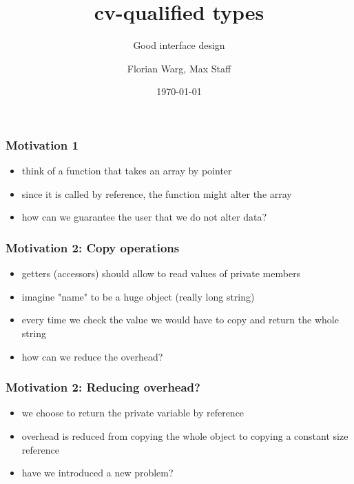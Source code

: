 



\title{cv-qualified types}
\subtitle{Good interface design}
\date{\today}
\author{Florian Warg, Max Staff}

\maketitle

\begin{frame}[fragile]
    \frametitle{Motivation 1}
    \begin{itemize}
        \begin{lstlisting}[numbers=none]
int min(int* arr, size_t len);
        \end{lstlisting}
    \item think of a function that takes an array by pointer
    \item since it is called by reference, the function might alter the array
    \item how can we guarantee the user that we do not alter data?
    \end{itemize}
\end{frame}

\begin{frame}[fragile]
    \frametitle{Motivation 2: Copy operations}
    \begin{itemize}
        \begin{lstlisting}[numbers=none]
class Person {
private:
    string name;
    int age;
public:
    /* ... */
    string getName() { return name; }
};
        \end{lstlisting}
    \item getters (accessors) should allow to read values of private members
    \item imagine "name" to be a huge object (really long string)
    \item every time we check the value we would have to copy and return the whole string
    \item how can we reduce the overhead?
    \end{itemize}
\end{frame}

\begin{frame}[fragile]
    \frametitle{Motivation 2: Reducing overhead?}
    \begin{itemize}
        \begin{lstlisting}[numbers=none]
class Person {
private:
    string name;
    int age;
public:
    /* ... */
    string& getName() { return name; }
};
        \end{lstlisting}
    \item we choose to return the private variable by reference
    \item overhead is reduced from copying the whole object to copying a constant size reference
    \item have we introduced a new problem?
    \end{itemize}
\end{frame}

